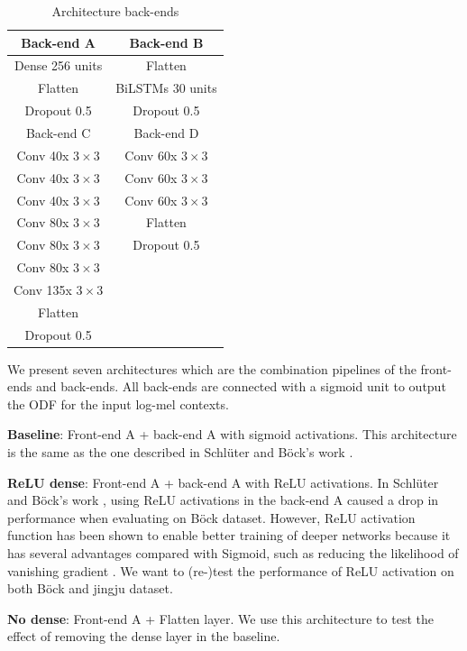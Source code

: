 \begin{table}[ht!]
\centering
\caption{Architecture back-ends}
\label{table:back_ends}
\begin{tabular}{c|c}
\toprule
Back-end A  & Back-end B    \\
\midrule
Dense 256 units & Flatten \\
Flatten & BiLSTMs 30 units \\
Dropout 0.5 & Dropout 0.5\\

\toprule
Back-end C  & Back-end D    \\
\midrule
Conv 40x $3{\times}3$ & Conv 60x $3{\times}3$ \\
Conv 40x $3{\times}3$ & Conv 60x $3{\times}3$ \\
Conv 40x $3{\times}3$ & Conv 60x $3{\times}3$ \\
Conv 80x $3{\times}3$ & Flatten \\
Conv 80x $3{\times}3$ & Dropout 0.5 \\
Conv 80x $3{\times}3$ & \\
Conv 135x $3{\times}3$ & \\
Flatten & \\
Dropout 0.5 & \\
\bottomrule
\end{tabular}
\end{table}

We present seven architectures which are the combination pipelines of the front-ends and back-ends. All back-ends are connected with a sigmoid unit to output the \gls{ODF} for the input log-mel contexts.

\noindent\textbf{Baseline}: Front-end A + back-end A with sigmoid activations. This architecture is the same as the one described in Schl\"{u}ter and B\"{o}ck's work \cite{Schluter2014}.

\noindent\textbf{ReLU dense}: Front-end A + back-end A with \gls{ReLU} activations. In Schl\"{u}ter and B\"{o}ck's work \cite{Schluter2014}, using \gls{ReLU} activations in the back-end A caused a drop in performance when evaluating on B\"{o}ck dataset. However, \gls{ReLU} activation function has been shown to enable better training of deeper networks because it has several advantages compared with Sigmoid, such as reducing the likelihood of vanishing gradient \cite{Glorot2011}. We want to (re-)test the performance of \gls{ReLU} activation on both B\"{o}ck and jingju dataset.

\noindent\textbf{No dense}: Front-end A + Flatten layer. We use this architecture to test the effect of removing the dense layer in the baseline.

